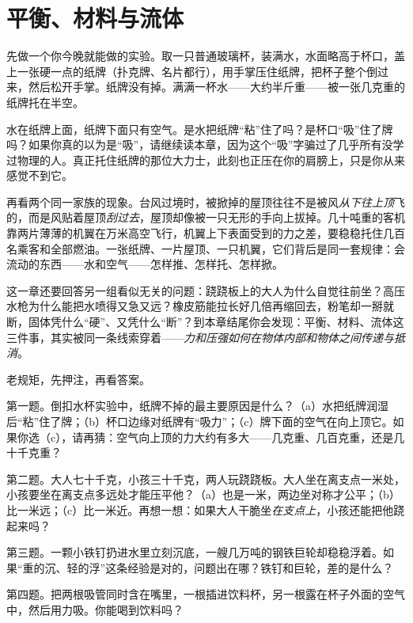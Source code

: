 \chapter{平衡、材料与流体}


\begin{mainline}
先做一个你今晚就能做的实验。取一只普通玻璃杯，装满水，水面略高于杯口，盖上一张硬一点的纸牌（扑克牌、名片都行），用手掌压住纸牌，把杯子整个倒过来，然后松开手掌。纸牌没有掉。满满一杯水——大约半斤重——被一张几克重的纸牌托在半空。

水在纸牌上面，纸牌下面只有空气。是水把纸牌“粘”住了吗？是杯口“吸”住了牌吗？如果你真的以为是“吸”，请继续读本章，因为这个“吸”字骗过了几乎所有没学过物理的人。真正托住纸牌的那位大力士，此刻也正压在你的肩膀上，只是你从来感觉不到它。

再看两个同一家族的现象。台风过境时，被掀掉的屋顶往往不是被风\emph{从下往上顶}飞的，而是风贴着屋顶\emph{刮过去}，屋顶却像被一只无形的手向上拔掉。几十吨重的客机靠两片薄薄的机翼在万米高空飞行，机翼上下表面受到的力之差，要稳稳托住几百名乘客和全部燃油。一张纸牌、一片屋顶、一只机翼，它们背后是同一套规律：会流动的东西——水和空气——怎样推、怎样托、怎样掀。

这一章还要回答另一组看似无关的问题：跷跷板上的大人为什么自觉往前坐？高压水枪为什么能把水喷得又急又远？橡皮筋能拉长好几倍再缩回去，粉笔却一掰就断，固体凭什么“硬”、又凭什么“断”？到本章结尾你会发现：平衡、材料、流体这三件事，其实被同一条线索穿着——\emph{力和压强如何在物体内部和物体之间传递与抵消}。
\end{mainline}


老规矩，先押注，再看答案。

第一题。倒扣水杯实验中，纸牌不掉的最主要原因是什么？（a）水把纸牌润湿后“粘”住了牌；（b）杯口边缘对纸牌有“吸力”；（c）牌下面的空气在向上顶它。如果你选（c），请再猜：空气向上顶的力大约有多大——几克重、几百克重，还是几十千克重？

第二题。大人七十千克，小孩三十千克，两人玩跷跷板。大人坐在离支点一米处，小孩要坐在离支点多远处才能压平他？（a）也是一米，两边坐对称才公平；（b）比一米远；（c）比一米近。再想一想：如果大人干脆坐\emph{在支点上}，小孩还能把他跷起来吗？

第三题。一颗小铁钉扔进水里立刻沉底，一艘几万吨的钢铁巨轮却稳稳浮着。如果“重的沉、轻的浮”这条经验是对的，问题出在哪？铁钉和巨轮，差的是什么？

第四题。把两根吸管同时含在嘴里，一根插进饮料杯，另一根露在杯子外面的空气中，然后用力吸。你能喝到饮料吗？

